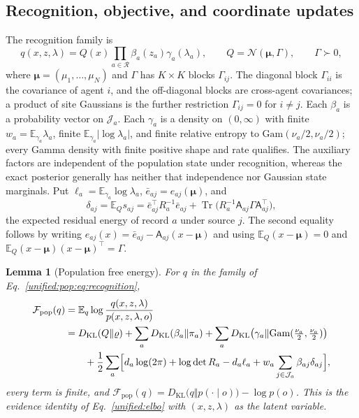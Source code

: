 \documentclass[11pt]{article}
\newtheorem{lemma}[theorem]{Lemma}
\theoremstyle{definition}
\theoremstyle{remark}
\providecommand{\KL}{D_{\mathrm{KL}}}
\providecommand{\Tr}{\operatorname{Tr}}
\providecommand{\E}{\mathbb{E}}
\providecommand{\N}{\mathcal{N}}
\providecommand{\F}{\mathcal{F}}
\begin{document}
\subsection{Recognition, objective, and coordinate updates}

The recognition family is
\begin{equation}
q(x,z,\lambda)=Q(x)\prod_{a\in\mathcal R}\beta_a(z_a)\gamma_a(\lambda_a),\qquad Q=\N(\boldsymbol\mu,\Gamma),\qquad\Gamma\succ0,
\label{unified:pop:eq:recognition}
\end{equation}
where $\boldsymbol\mu=(\mu_1,\ldots,\mu_N)$ and $\Gamma$ has $K\times K$ blocks $\Gamma_{ij}$. The diagonal block $\Gamma_{ii}$ is the covariance of agent $i$, and the off-diagonal blocks are cross-agent covariances; a product of site Gaussians is the further restriction $\Gamma_{ij}=0$ for $i\ne j$. Each $\beta_a$ is a probability vector on $\mathcal J_a$. Each $\gamma_a$ is a density on $(0,\infty)$ with finite $w_a=\E_{\gamma_a}\lambda_a$, finite $\E_{\gamma_a}\lvert\log\lambda_a\rvert$, and finite relative entropy to $\mathrm{Gam}(\nu_a/2,\nu_a/2)$; every Gamma density with finite positive shape and rate qualifies. The auxiliary factors are independent of the population state under recognition, whereas the exact posterior generally has neither that independence nor Gaussian state marginals. Put $\ell_a=\E_{\gamma_a}\log\lambda_a$, $\bar e_{aj}=e_{aj}(\boldsymbol\mu)$, and
\begin{equation}
\delta_{aj}=\E_Qs_{aj}=\bar e_{aj}^\top R_a^{-1}\bar e_{aj}+\Tr\bigl(R_a^{-1}\mathsf A_{aj}\Gamma\mathsf A_{aj}^\top\bigr),
\label{unified:pop:eq:residual}
\end{equation}
the expected residual energy of record $a$ under source $j$. The second equality follows by writing $e_{aj}(x)=\bar e_{aj}-\mathsf A_{aj}(x-\boldsymbol\mu)$ and using $\E_Q(x-\boldsymbol\mu)=0$ and $\E_Q(x-\boldsymbol\mu)(x-\boldsymbol\mu)^\top=\Gamma$.

\begin{lemma}[Population free energy]
\label{unified:pop:lem:free_energy}
For $q$ in the family of Eq.~\eqref{unified:pop:eq:recognition},
\begin{equation}
\begin{aligned}
\F_{\mathrm{pop}}(q)&=\E_q\log\frac{q(x,z,\lambda)}{p(x,z,\lambda,o)}\\
&=\KL(Q\Vert\varrho)+\sum_a\KL(\beta_a\Vert\pi_a)+\sum_a\KL\bigl(\gamma_a\Vert\mathrm{Gam}(\tfrac{\nu_a}{2},\tfrac{\nu_a}{2})\bigr)\\
&\qquad+\frac12\sum_a\Bigl[d_a\log(2\pi)+\log\det R_a-d_a\ell_a+w_a\sum_{j\in\mathcal J_a}\beta_{aj}\delta_{aj}\Bigr],
\end{aligned}
\label{unified:pop:eq:free_energy}
\end{equation}
every term is finite, and $\F_{\mathrm{pop}}(q)=\KL\bigl(q\Vert p(\cdot\mid o)\bigr)-\log p(o)$. This is the evidence identity of Eq.~\eqref{unified:elbo} with $(x,z,\lambda)$ as the latent variable.
\end{lemma}
\end{document}
